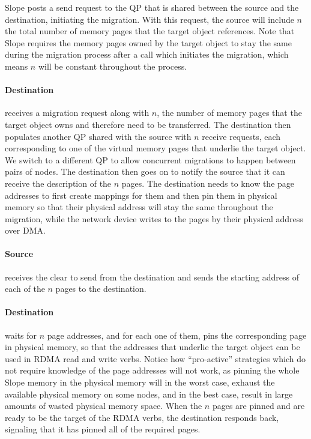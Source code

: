 Slope posts a send request to the QP that is shared
between the source and the destination, initiating the migration.
With this request, the source will include $n$ the total number of
memory pages that the target object references. Note that Slope requires the
memory pages owned by the target object to stay the same during the migration
process after a call which initiates the migration, which means $n$ will be
constant throughout the process.

\paragraph{Destination}
receives a migration request along with $n$, the number of memory pages that the
target object owns and therefore need to
be transferred. The destination then populates another QP shared with the source
with $n$ receive requests, each corresponding to one of the virtual memory pages
that underlie the target object. We switch to a different QP
to allow concurrent migrations to happen between pairs of nodes. The destination
then goes on to notify the source that it can receive the description of the $n$
pages. The destination needs to know the page addresses
to first create mappings for them and then pin them in physical memory so that their
physical address will stay the same throughout the migration, while the network
device writes to the pages by their physical address over DMA.

\paragraph{Source} receives the clear to send from the destination and sends the starting address
of each of the $n$ pages to the destination. 

\paragraph{Destination} waits for $n$ page addresses, and for each one of them, pins the
corresponding page in physical memory, so that the addresses that underlie the
target object can be used in RDMA read and write verbs. Notice how
``pro-active'' strategies which do not require knowledge of the page addresses
will not work, as pinning the
whole Slope memory in the physical memory will in the worst case, exhaust the
available physical memory on some nodes, and in the best case, result in large
amounts of wasted physical memory space. When the $n$ pages are pinned
and are ready to be the target of the RDMA verbs, the destination responds back,
signaling that it has pinned all of the required pages.

